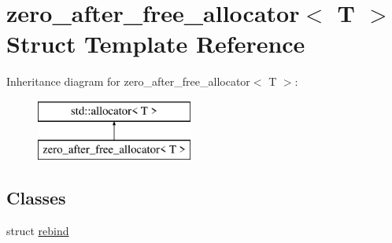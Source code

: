 \hypertarget{structzero__after__free__allocator}{}\section{zero\+\_\+after\+\_\+free\+\_\+allocator$<$ T $>$ Struct Template Reference}
\label{structzero__after__free__allocator}
Inheritance diagram for zero\+\_\+after\+\_\+free\+\_\+allocator$<$ T $>$\+:\begin{figure}[H]
\begin{center}
\leavevmode
\includegraphics[height=2.000000cm]{structzero__after__free__allocator}
\end{center}
\end{figure}
\subsection*{Classes}
\begin{DoxyCompactItemize}
\item 
struct \mbox{\hyperlink{structzero__after__free__allocator_1_1rebind}{rebind}}
\end{DoxyCompactItemize}
